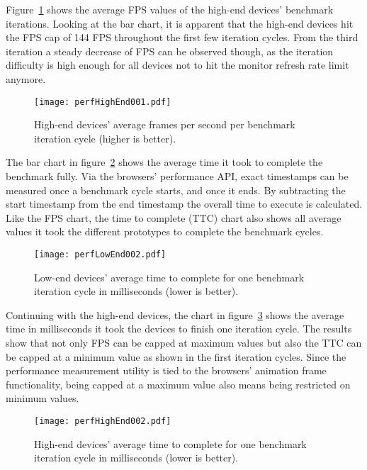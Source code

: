 Figure~\ref{fig:perfHighEnd001} shows the average FPS values of the high-end devices' benchmark iterations. Looking at the bar chart, it is apparent that the high-end devices hit the FPS cap of 144 FPS throughout the first few iteration cycles. From the third iteration a steady decrease of FPS can be observed though, as the iteration difficulty is high enough for all devices not to hit the monitor refresh rate limit anymore.

\begin{figure}
\centering
\texttt{[image: perfHighEnd001.pdf]}
\caption{High-end devices' average frames per second per benchmark iteration cycle (higher is better).}
\label{fig:perfHighEnd001}
\end{figure}

The bar chart in figure~\ref{fig:perfLowEnd002} shows the average time it took to complete the benchmark fully. Via the browsers' performance API, exact timestamps can be measured once a benchmark cycle starts, and once it ends. By subtracting the start timestamp from the end timestamp the overall time to execute is calculated. Like the FPS chart, the time to complete (TTC) chart also shows all average values it took the different prototypes to complete the benchmark cycles.

\begin{figure}
\centering
\texttt{[image: perfLowEnd002.pdf]}
\caption{Low-end devices' average time to complete for one benchmark iteration cycle in milliseconds (lower is better).}
\label{fig:perfLowEnd002}
\end{figure}

Continuing with the high-end devices, the chart in figure~\ref{fig:perfHighEnd002} shows the average time in milliseconds it took the devices to finish one iteration cycle. The results show that not only FPS can be capped at maximum values but also the TTC can be capped at a minimum value as shown in the first iteration cycles. Since the performance measurement utility is tied to the browsers' animation frame functionality, being capped at a maximum value also means being restricted on minimum values.

\begin{figure}
\centering
\texttt{[image: perfHighEnd002.pdf]}
\caption{High-end devices' average time to complete for one benchmark iteration cycle in milliseconds (lower is better).}
\label{fig:perfHighEnd002}
\end{figure}

